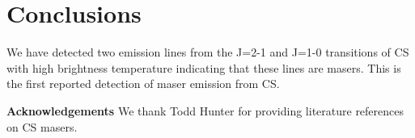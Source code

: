 \documentclass[twocolumn]{aastex62}
\begin{document}
\section{Conclusions}
We have detected two emission lines from the J=2-1 and J=1-0 transitions of CS
with high brightness temperature indicating that these lines are masers.
This is the first reported detection of maser emission from CS.

\textbf{Acknowledgements}
We thank Todd Hunter for providing literature references on CS masers.


\end{document}
